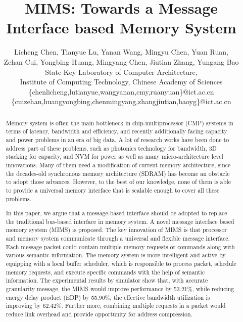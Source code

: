 \documentclass[pageno]{jpaper}
\begin{document}
\title{
MIMS: Towards a Message Interface based Memory System}

\date{}

\author{Licheng Chen, Tianyue Lu, Yanan Wang, Mingyu Chen, Yuan Ruan, \\ Zehan Cui, Yongbing Huang, Mingyang Chen, Jiutian Zhang, Yungang Bao \\ State Key Laboratory of Computer Architecture, \\ Institute of Computing Technology, Chinese Academy of Sciences \\ \{chenlicheng,lutianyue,wangyanan,cmy,ruanyuan\}@ict.ac.cn \\ \{cuizehan,huangyongbing,chenmingyang,zhangjiutian,baoyg\}@ict.ac.cn}








\maketitle

\thispagestyle{empty}

\begin{abstract}
Memory system is often the main bottleneck in chip-multiprocessor (CMP) systems in terms of latency, bandwidth and efficiency, and recently additionally facing  capacity and power problems in an era of big data. A lot of research works have been done to address part of these problems, such as photonics technology for bandwidth, 3D stacking for capacity, and NVM for power as well as many micro-architecture level innovations. Many of them need a modification of current memory architecture, since the decades-old synchronous memory architecture (SDRAM) has become an obstacle to adopt those advances. However, to the best of our knowledge, none of them is able to provide a universal memory interface that is scalable enough to cover all these problems.

In this paper, we argue that a message-based interface should be adopted to replace the traditional bus-based interface in memory system. A novel message interface based memory system (MIMS) is proposed. The key innovation of MIMS is that processor and memory system communicate through a universal and flexible message interface. Each message packet could contain multiple memory requests or commands along with various semantic information. The memory system is more intelligent and active by equipping with a local buffer scheduler, which is responsible to process packet, schedule memory requests, and execute specific commands with the help of semantic information. The experimental results by simulator show that, with accurate granularity message, the MIMS would improve performance by 53.21\%, while reducing energy delay product (EDP) by 55.90\%, the effective bandwidth utilization is improving by 62.42\%. Further more, combining multiple requests in a packet would reduce link overhead and provide opportunity for address compression.

\end{abstract}
\end{document}
